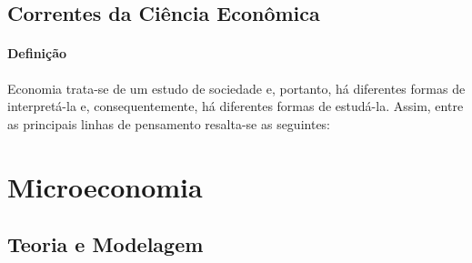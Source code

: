 \documentclass{article}
\begin{document}
        \subsection{Correntes da Ciência Econômica}
            \paragraph{Definição}Economia trata-se de um estudo de sociedade e, portanto, há diferentes formas de interpretá-la e, consequentemente, há diferentes formas de estudá-la. Assim, entre as principais linhas de pensamento resalta-se as seguintes:

    \section{Microeconomia}

        \subsection{Teoria e Modelagem}
\end{document}
